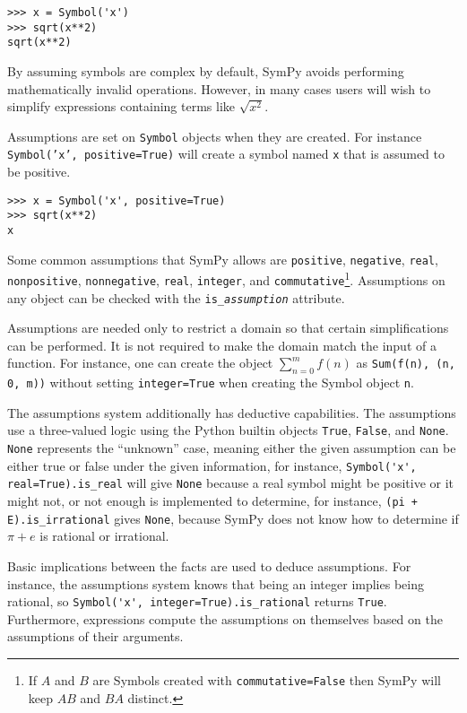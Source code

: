 \begin{verbatim}
>>> x = Symbol('x')
>>> sqrt(x**2)
sqrt(x**2)
\end{verbatim}

By assuming symbols are complex by default, SymPy avoids performing
mathematically invalid operations. However, in many cases users will wish to
simplify expressions containing terms like $\sqrt{x^2}$.

Assumptions are set on \texttt{Symbol} objects when they are created. For
instance \texttt{Symbol('x', positive=True)} will create a symbol named
\texttt{x} that is assumed to be positive.

\begin{verbatim}
>>> x = Symbol('x', positive=True)
>>> sqrt(x**2)
x
\end{verbatim}

Some common assumptions that SymPy allows are \texttt{positive},
\texttt{negative}, \texttt{real}, \texttt{nonpositive}, \texttt{nonnegative},
\texttt{real}, \texttt{integer}, and \texttt{commutative}\footnote{If $A$ and
  $B$ are Symbols created with \texttt{commutative=False} then SymPy will keep
  $AB$ and $BA$ distinct.}. Assumptions on any object can be checked with the
\verb|is_|\texttt{\textit{assumption}} attribute.

Assumptions are needed only to restrict a domain so that certain
simplifications can be performed. It is not required to make the domain match
the input of a function. For instance, one can create the object
$\sum_{n=0}^m f(n)$ as \texttt{Sum(f(n), (n, 0, m))} without setting
\texttt{integer=True} when creating the Symbol object \texttt{n}.

The assumptions system additionally has deductive capabilities. The
assumptions use a three-valued logic using the Python builtin objects
\texttt{True}, \texttt{False}, and \texttt{None}. \texttt{None} represents the
``unknown'' case, meaning either the given assumption can be either true or
false under the given information, for instance, \verb|Symbol('x', real=True).is_real|
will give \texttt{None} because a real symbol might be
positive or it might not, or not enough is implemented to determine, for
instance, \verb|(pi + E).is_irrational| gives \texttt{None}, because SymPy
does not know how to determine if $\pi + e$ is rational or irrational.

Basic implications between the facts are used to deduce assumptions. For
instance, the assumptions system knows that being an integer implies being
rational, so \verb|Symbol('x', integer=True).is_rational| returns
\texttt{True}. Furthermore, expressions compute the assumptions on themselves
based on the assumptions of their arguments.

